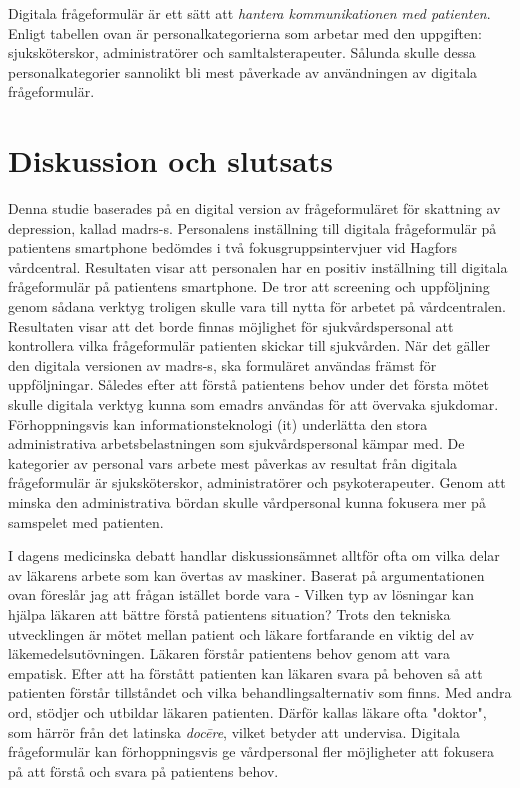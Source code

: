 \documentclass[12pt,a4paper,oneside]{article}
\let\oldcite\cite
\renewcommand*\cite[1]{\textsuperscript{\oldcite{#1}}}
\begin{document}
\newpage
Digitala fr{\aa}geformul{\"a}r {\"a}r ett s{\"a}tt att {\it hantera kommunikationen med patienten}. Enligt tabellen ovan {\"a}r personalkategorierna som arbetar med den uppgiften: sjuksk{\"o}terskor, administrat{\"o}rer och samltalsterapeuter. S{\aa}lunda skulle dessa personalkategorier sannolikt bli mest p{\aa}verkade av anv{\"a}ndningen av digitala fr{\aa}geformul{\"a}r.

\section*{Diskussion och slutsats}
Denna studie baserades p{\aa} en digital version av fr{\aa}geformul{\"a}ret f{\"o}r skattning av depression, kallad {\sc madrs-s}. Personalens inst{\"a}llning till digitala fr{\aa}geformul{\"a}r p{\aa} patientens smartphone bed{\"o}mdes i tv{\aa} fokusgruppsintervjuer vid Hagfors v{\aa}rdcentral. Resultaten visar att personalen har en positiv inst{\"a}llning till digitala fr{\aa}geformul{\"a}r p{\aa} patientens smartphone. De tror att screening och uppf{\"o}ljning genom s{\aa}dana verktyg troligen skulle vara till nytta f{\"o}r arbetet p{\aa} v{\aa}rdcentralen. Resultaten visar att det borde finnas m{\"o}jlighet f{\"o}r sjukv{\aa}rdspersonal att kontrollera vilka fr{\aa}geformul{\"a}r patienten skickar till sjukv{\aa}rden. N{\"a}r det g{\"a}ller den digitala versionen av {\sc madrs-s}, ska formul{\"a}ret anv{\"a}ndas fr{\"a}mst f{\"o}r uppf{\"o}ljningar. S{\aa}ledes efter att f{\"o}rst{\aa} patientens behov under det f{\"o}rsta m{\"o}tet skulle digitala verktyg kunna som e{\sc madrs} anv{\"a}ndas f{\"o}r att {\"o}vervaka sjukdomar. F{\"o}rhoppningsvis kan informationsteknologi ({\sc it}) underl{\"a}tta den stora administrativa arbetsbelastningen som sjukv{\aa}rdspersonal k{\"a}mpar med\cite{disc2}. De kategorier av personal vars arbete mest p{\aa}verkas av resultat fr{\aa}n digitala fr{\aa}geformul{\"a}r {\"a}r sjuksk{\"o}terskor, administrat{\"o}rer och psykoterapeuter. Genom att minska den administrativa b{\"o}rdan skulle v{\aa}rdpersonal kunna fokusera mer p{\aa} samspelet med patienten.

I dagens medicinska debatt handlar diskussions{\"a}mnet alltf{\"o}r ofta om vilka delar av l{\"a}karens arbete som kan {\"o}vertas av maskiner\cite{disc3}. Baserat p{\aa} argumentationen ovan f{\"o}resl{\aa}r jag att fr{\aa}gan ist{\"a}llet borde vara - Vilken typ av l{\"o}sningar kan hj{\"a}lpa l{\"a}karen att b{\"a}ttre f{\"o}rst{\aa} patientens situation? Trots den tekniska utvecklingen {\"a}r m{\"o}tet mellan patient och l{\"a}kare fortfarande en viktig del av l{\"a}kemedelsut{\"o}vningen. L{\"a}karen f{\"o}rst{\aa}r patientens behov genom att vara empatisk\cite{disc3}. Efter att ha f{\"o}rst{\aa}tt patienten kan l{\"a}karen svara p{\aa} behoven s{\aa} att patienten f{\"o}rst{\aa}r tillst{\aa}ndet och vilka behandlingsalternativ som finns. Med andra ord, st{\"o}djer och utbildar l{\"a}karen patienten. D{\"a}rf{\"o}r kallas l{\"a}kare ofta "doktor", som h{\"a}rr{\"o}r fr{\aa}n det latinska {\it doc{\=e}re}, vilket betyder att undervisa\cite{disc5}. Digitala fr{\aa}geformul{\"a}r kan f{\"o}rhoppningsvis ge v{\aa}rdpersonal fler m{\"o}jligheter att fokusera p{\aa} att f{\"o}rst{\aa} och svara p{\aa} patientens behov.
\end{document}

